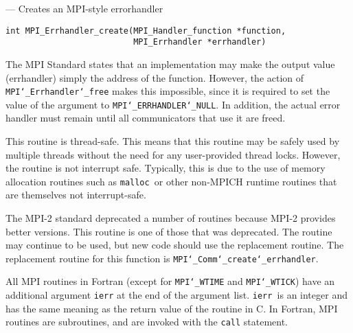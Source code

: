 \startmanpage
{}
--- Creates an MPI-style errorhandler 
\startvb\begin{verbatim}
int MPI_Errhandler_create(MPI_Handler_function *function, 
                          MPI_Errhandler *errhandler)

\end{verbatim}
\endvb

\par
{}
\par
{}
The MPI Standard states that an implementation may make the output value
(errhandler) simply the address of the function.  However, the action of
{\tt MPI{\tt \char`\_}Errhandler{\tt \char`\_}free} makes this impossible, since it is required to set the
value of the argument to {\tt MPI{\tt \char`\_}ERRHANDLER{\tt \char`\_}NULL}.  In addition, the actual
error handler must remain until all communicators that use it are
freed.
\par
{}
\par
This routine is thread-safe.  This means that this routine may be
safely used by multiple threads without the need for any user-provided
thread locks.  However, the routine is not interrupt safe.  Typically,
this is due to the use of memory allocation routines such as {\tt malloc
}or other non-MPICH runtime routines that are themselves not interrupt-safe.
\par
{}
The MPI-2 standard deprecated a number of routines because MPI-2 provides
better versions.  This routine is one of those that was deprecated.  The
routine may continue to be used, but new code should use the replacement
routine.
The replacement routine for this function is {\tt MPI{\tt \char`\_}Comm{\tt \char`\_}create{\tt \char`\_}errhandler}.
\par
{}
All MPI routines in Fortran (except for {\tt MPI{\tt \char`\_}WTIME} and {\tt MPI{\tt \char`\_}WTICK}) have
an additional argument {\tt ierr} at the end of the argument list.  {\tt ierr
}is an integer and has the same meaning as the return value of the routine
in C.  In Fortran, MPI routines are subroutines, and are invoked with the
{\tt call} statement.
\par
